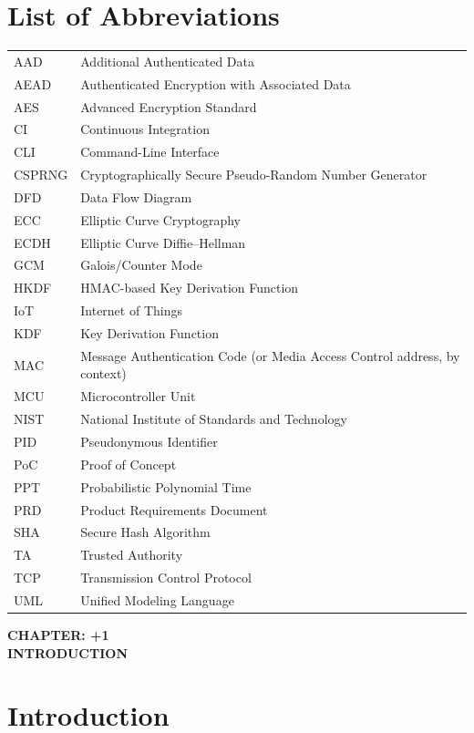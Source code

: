 \documentclass[12pt,a4paper,oneside]{report}
\numberwithin{equation}{chapter}
\newcommand{\ChapterDivider}[1]{%
  \clearpage\thispagestyle{empty}\null\vfill
  \begin{center}{\large\bfseries CHAPTER: \number\numexpr\value{chapter}+1\relax}\\[1.2in]{\large\bfseries\MakeUppercase{#1}}\end{center}
  \vfill\null\clearpage}
\begin{document}
\chapter*{List of Abbreviations}
\begin{tabular}{lp{}}
AAD & Additional Authenticated Data\\
AEAD & Authenticated Encryption with Associated Data\\
AES & Advanced Encryption Standard\\
CI & Continuous Integration\\
CLI & Command-Line Interface\\
CSPRNG & Cryptographically Secure Pseudo-Random Number Generator\\
DFD & Data Flow Diagram\\
ECC & Elliptic Curve Cryptography\\
ECDH & Elliptic Curve Diffie--Hellman\\
GCM & Galois/Counter Mode\\
HKDF & HMAC-based Key Derivation Function\\
IoT & Internet of Things\\
KDF & Key Derivation Function\\
MAC & Message Authentication Code (or Media Access Control address, by context)\\
MCU & Microcontroller Unit\\
NIST & National Institute of Standards and Technology\\
PID & Pseudonymous Identifier\\
PoC & Proof of Concept\\
PPT & Probabilistic Polynomial Time\\
PRD & Product Requirements Document\\
SHA & Secure Hash Algorithm\\
TA & Trusted Authority\\
TCP & Transmission Control Protocol\\
UML & Unified Modeling Language\\
\end{tabular}

\clearpage
{}
\setcounter{page}{1}

\ChapterDivider{Introduction}
\chapter{Introduction}
\end{document}
